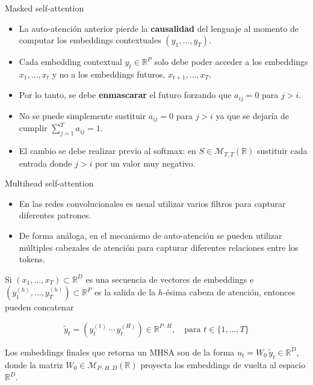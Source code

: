 \documentclass{beamer}
\newcommand{\R}{\mathbb{R}}
\begin{document}
\begin{frame}{Masked self-attention}

    \begin{itemize}
        \item La auto-atención anterior pierde la \textbf{causalidad} del lenguaje al momento de computar los embeddings contextuales $(y_1,\ldots,y_T)$.
        \item Cada embedding contextual $y_t\in\R^P$ solo debe poder acceder a los embeddings $x_1,\ldots,x_t$ y no a los embeddings futuros, $x_{t+1},\ldots,x_T$.
        \item Por lo tanto, se debe \textbf{enmascarar} el futuro forzando que $a_{ij}=0$ para $j>i$. \item No se puede simplemente sustituir $a_{ij}=0$ para $j>i$ ya que se dejaría de cumplir $\sum_{j=1}^T a_{ij}=1$.
        \item El cambio se debe realizar previo al softmax: en $S\in\mathcal{M}_{T,T}(\R)$ sustituir  cada entrada donde $j>i$ por un valor muy negativo.
    \end{itemize}

\end{frame}

\begin{frame}{Multihead self-attention}

    \begin{itemize}
        \item En las redes convolucionales es usual utilizar varios filtros para capturar diferentes patrones.
        \item De forma análoga, en el mecanismo de auto-atención se pueden utilizar múltiples cabezales de atención para capturar diferentes relaciones entre los tokens.
    \end{itemize}

    Si $(x_1,\ldots,x_T)\subset\R^D$ es una secuencia de vectores de embeddings e $(y_1^{(h)},\ldots,y_T^{(h)})\subset\R^P$ es la salida de la $h$-ésima cabeza de atención, entonces pueden concatenar

    \begin{equation*}
        \tilde y_t=\left(y_t^{(1)}\,\cdots\, y_t^{(H)}\right)\in\R^{P\cdot H},\quad \text{para } t\in\{1,\ldots,T\}
    \end{equation*}

    Los embeddings finales que retorna un MHSA son de la forma $u_t=W_0\, \tilde y_t\in\R^D$, donde la matriz $W_0\in\mathcal{M}_{P\cdot H,D}(\R)$ proyecta los embeddings de vuelta al espacio $\R^D$. 

\end{frame}
\end{document}
